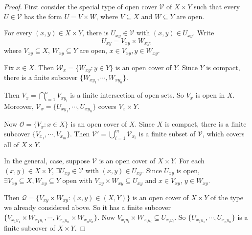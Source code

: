 \documentclass[a4paper]{article}
\begin{document}
\begin{proof}
  First consider the special type of open cover $\mathcal{V}$ of $X\times Y$ such that every $U\in \mathcal{V}$ has the form $U = V\times W$, where $V\subseteq X$ and $W\subseteq Y$ are open.

  For every $(x, y) \in X\times Y$, there is $U_{xy}\in \mathcal{V}$ with $(x, y)\in U_{xy}$. Write
  \[
    U_{xy} = V_{xy}\times W_{xy},
  \]
  where $V_{xy}\subseteq X$, $W_{xy}\subseteq Y$ are open, $x\in V_{xy}, y\in W_{xy}$.

  Fix $x\in X$. Then $\mathcal{W}_x = \{W_{xy}: y\in Y\}$ is an open cover of $Y$. Since $Y$ is compact, there is a finite subcover $\{W_{xy_1}, \cdots, W_{xy_n}\}$.

  Then $V_x = \bigcap_{i = 1}^n V_{xy_i}$ is a finite intersection of open sets. So $V_x$ is open in $X$. Moreover, $\mathcal{V}_x = \{U_{xy_1},\cdots , U_{xy_n}\}$ covers $V_x \times Y$.
  \begin{center}
  \end{center}
  Now $\mathcal{O} = \{V_x: x\in X\}$ is an open cover of $X$. Since $X$ is compact, there is a finite subcover $\{V_{x_1}, \cdots, V_{x_m}\}$. Then $\mathcal{V}' = \bigcup_{i = 1}^m \mathcal{V}_{x_i}$ is a finite subset of $\mathcal{V}$, which covers all of $X\times Y$.

  In the general, case, suppose $\mathcal{V}$ is an open cover of $X\times Y$. For each $(x, y) \in X\times Y$, $\exists U_{xy}\in \mathcal{V}$ with $(x, y)\in U_{xy}$. Since $U_{xy}$ is open, $\exists V_{xy}\subseteq X, W_{xy}\subseteq Y$ open with $V_{xy}\times W_{xy}\subseteq U_{xy}$ and $x\in V_{xy}$, $y\in W_{xy}$.

  Then $\mathcal{Q} = \{V_{xy}\times W_{xy}: (x, y)\in (X, Y)\}$ is an open cover of $X\times Y$ of the type we already considered above. So it has a finite subcover $\{V_{x_1y_1}\times W_{x_1y_1}, \cdots, V_{x_n y_n}\times W_{x_n y_n}\}$. Now $V_{x_iy_i} \times W_{x_iy_i} \subseteq U_{x_iy_i}$. So $\{U_{x_1y_1},\cdots, U_{x_n y_n}\}$ is a finite subcover of $X\times Y$.
\end{proof}
\end{document}
